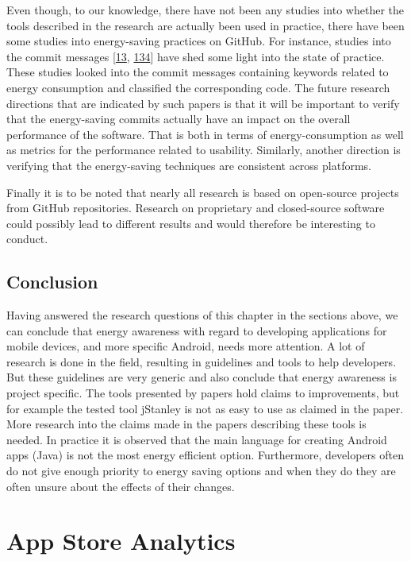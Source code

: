\documentclass[]{book}
\begin{document}
Even though, to our knowledge, there have not been any studies into
whether the tools described in the research are actually been used in
practice, there have been some studies into energy-saving practices on
GitHub. For instance, studies into the commit messages
{[}\protect\hyperlink{ref-BLXWT2016}{13},
\protect\hyperlink{ref-MPEC2015}{134}{]} have shed some light into the
state of practice. These studies looked into the commit messages
containing keywords related to energy consumption and classified the
corresponding code. The future research directions that are indicated by
such papers is that it will be important to verify that the
energy-saving commits actually have an impact on the overall performance
of the software. That is both in terms of energy-consumption as well as
metrics for the performance related to usability. Similarly, another
direction is verifying that the energy-saving techniques are consistent
across platforms.

Finally it is to be noted that nearly all research is based on
open-source projects from GitHub repositories. Research on proprietary
and closed-source software could possibly lead to different results and
would therefore be interesting to conduct.

\section{Conclusion}\label{conclusion-2}

Having answered the research questions of this chapter in the sections
above, we can conclude that energy awareness with regard to developing
applications for mobile devices, and more specific Android, needs more
attention. A lot of research is done in the field, resulting in
guidelines and tools to help developers. But these guidelines are very
generic and also conclude that energy awareness is project specific. The
tools presented by papers hold claims to improvements, but for example
the tested tool jStanley is not as easy to use as claimed in the paper.
More research into the claims made in the papers describing these tools
is needed. In practice it is observed that the main language for
creating Android apps (Java) is not the most energy efficient option.
Furthermore, developers often do not give enough priority to energy
saving options and when they do they are often unsure about the effects
of their changes.

\chapter{App Store Analytics}\label{app-store-analytics}
\end{document}
